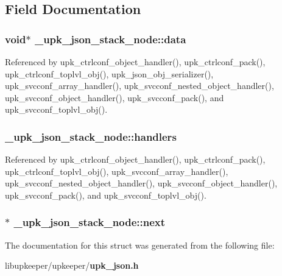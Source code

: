 \subsection{Field Documentation}
\subsubsection[{data}]{\setlength{\rightskip}{0pt plus 5cm}void$\ast$ {\bf \_\-upk\_\-json\_\-stack\_\-node::data}}\label{struct__upk__json__stack__node_a5f78b744ac28571069914673a0869033}


Referenced by upk\_\-ctrlconf\_\-object\_\-handler(), upk\_\-ctrlconf\_\-pack(), upk\_\-ctrlconf\_\-toplvl\_\-obj(), upk\_\-json\_\-obj\_\-serializer(), upk\_\-svcconf\_\-array\_\-handler(), upk\_\-svcconf\_\-nested\_\-object\_\-handler(), upk\_\-svcconf\_\-object\_\-handler(), upk\_\-svcconf\_\-pack(), and upk\_\-svcconf\_\-toplvl\_\-obj().

\subsubsection[{handlers}]{ {\bf \_\-upk\_\-json\_\-stack\_\-node::handlers}}\label{struct__upk__json__stack__node_ad22f4491f9086f1ccbd6696dd73736cf}


Referenced by upk\_\-ctrlconf\_\-object\_\-handler(), upk\_\-ctrlconf\_\-pack(), upk\_\-ctrlconf\_\-toplvl\_\-obj(), upk\_\-svcconf\_\-array\_\-handler(), upk\_\-svcconf\_\-nested\_\-object\_\-handler(), upk\_\-svcconf\_\-object\_\-handler(), upk\_\-svcconf\_\-pack(), and upk\_\-svcconf\_\-toplvl\_\-obj().

\subsubsection[{next}]{$\ast$ {\bf \_\-upk\_\-json\_\-stack\_\-node::next}}\label{struct__upk__json__stack__node_a3f4755d75ac7758d6b3ac8f782a1ab16}


The documentation for this struct was generated from the following file:\begin{DoxyCompactItemize}
\item 
libupkeeper/upkeeper/{\bf upk\_\-json.h}\end{DoxyCompactItemize}
